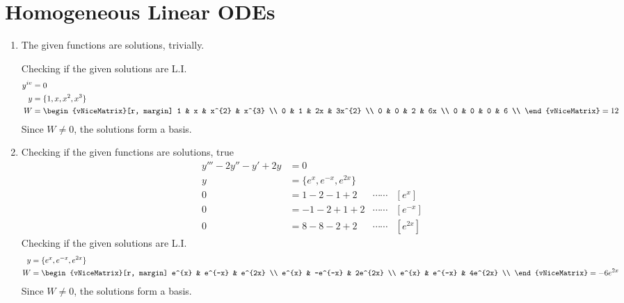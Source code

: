\section{Homogeneous Linear ODEs}
\begin{enumerate}
    \item The given functions are solutions, trivially. \par
          Checking if the given solutions are L.I.
          \begin{align}
              y^{iv} & = 0                             \\
              y      & = \{1, x, x^{2}, x^{3}\}        \\
              W      & = \begin{vNiceMatrix}[r, margin]
                             1 & x & x^{2} & x^{3}  \\
                             0 & 1 & 2x    & 3x^{2} \\
                             0 & 0 & 2     & 6x     \\
                             0 & 0 & 0     & 6      \\
                         \end{vNiceMatrix} = 12
          \end{align}
          Since $ W \neq 0 $, the solutions form a basis.

    \item Checking if the given functions are solutions, true
          \begin{align}
              y''' - 2y'' - y' + 2y & = 0                                                   \\
              y                     & = \{e^{x}, e^{-x}, e^{2x}\}                           \\
              0                     & = 1 - 2 - 1 + 2             & \cdots\cdots & [e^{x}]  \\
              0                     & = -1 - 2 + 1 + 2            & \cdots\cdots & [e^{-x}] \\
              0                     & = 8 - 8 - 2 + 2             & \cdots\cdots & [e^{2x}]
          \end{align}
          Checking if the given solutions are L.I.
          \begin{align}
              y & = \{e^{x}, e^{-x}, e^{2x}\}     \\
              W & = \begin{vNiceMatrix}[r, margin]
                        e^{x} & e^{-x}  & e^{2x}  \\
                        e^{x} & -e^{-x} & 2e^{2x} \\
                        e^{x} & e^{-x}  & 4e^{2x} \\
                    \end{vNiceMatrix} = - 6e^{2x}
          \end{align}
          Since $ W \neq 0 $, the solutions form a basis.


\end{enumerate}
